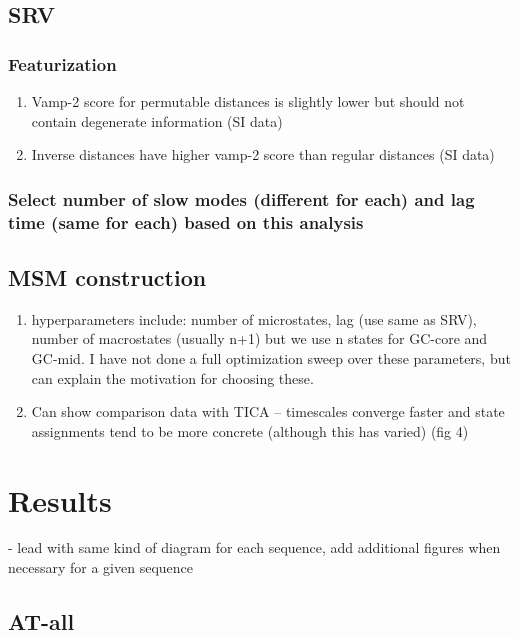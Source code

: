 \documentclass[journal=jpcbfk,manuscript=article]{achemso}
\begin{document}
\subsection{\label{sec:methods}SRV}
\subsubsection{\label{sec:methods}Featurization}
\begin{enumerate}
	\item Vamp-2 score for permutable distances is slightly lower but should not contain degenerate information (SI data)
	\item Inverse distances have higher vamp-2 score than regular distances (SI data)
\end{enumerate}

\subsubsection{\label{sec:methods}Select number of slow modes (different for each) and lag time (same for each) based on this analysis}

\subsection{\label{methods}MSM construction}
\begin{enumerate}
	\item hyperparameters include: number of microstates, lag (use same as SRV), number of macrostates (usually n+1) but we use n states for GC-core and GC-mid. I have not done a full optimization sweep over these parameters, but can explain the motivation for choosing these.
    \item Can show comparison data with TICA -- timescales converge faster and state assignments tend to be more concrete (although this has varied) (fig 4)
\end{enumerate}  

\section{\label{sec:Results}Results}
- lead with same kind of diagram for each sequence, add additional figures when necessary for a given sequence

\subsection{\label{sec:Results}AT-all}
\end{document}
